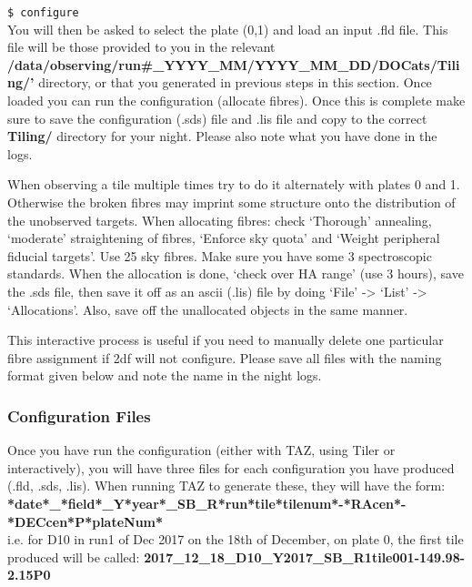 \documentclass[12pt]{article}
\begin{document}
\hspace{15mm} \texttt{\$ configure}\\

You will then be asked to select the plate (0,1) and load an input .fld file. This file will be those provided to you in the relevant \textbf{/data/observing/run\#\_YYYY\_MM/YYYY\_MM\_DD/DOCats/Tiling/'} directory, or that you generated in previous steps in this section. Once loaded you can run the configuration (allocate fibres). Once this is complete make sure to save the configuration (.sds) file and .lis file and copy to the correct \textbf{Tiling/} directory for your night. Please also note what you have done in the logs. 

When observing a tile multiple times try to do it alternately with plates 0 and 1. Otherwise the broken fibres may imprint some structure onto the distribution of the unobserved targets. When allocating fibres: check `Thorough' annealing, `moderate' straightening of fibres, `Enforce sky quota' and `Weight peripheral fiducial targets'. Use 25 sky fibres. Make sure you have some 3 spectroscopic standards. When the allocation is done, `check over HA range' (use 3 hours), save the .sds file, then save it off as an ascii (.lis) file by doing `File' -> `List' -> `Allocations'. Also, save off the unallocated objects in the same manner. 

This interactive process is useful if you need to manually delete one particular fibre assignment if 2df will not configure. Please save all files with the naming format given below and note the name in the night logs.       


\subsubsection{Configuration Files}

Once you have run the configuration (either with TAZ, using Tiler or interactively), you will have three files for each configuration you have produced (.fld, .sds, .lis). When running TAZ to generate these, they will have the form: \\

\hspace{5mm} \textbf{*date*\_*field*\_Y*year*\_SB\_R*run*tile*tilenum*-*RAcen*-*DECcen*P*plateNum*} \\


i.e. for D10 in run1 of Dec 2017 on the 18th of December, on plate 0, the first tile produced will be called:  \textbf{2017\_12\_18\_D10\_Y2017\_SB\_R1tile001-149.98-2.15P0}
\end{document}

